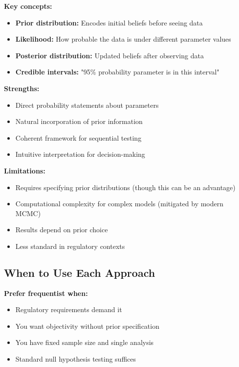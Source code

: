 \textbf{Key concepts:}
\begin{itemize}
    \item \textbf{Prior distribution:} Encodes initial beliefs before seeing data
    \item \textbf{Likelihood:} How probable the data is under different parameter values
    \item \textbf{Posterior distribution:} Updated beliefs after observing data
    \item \textbf{Credible intervals:} "95\% probability parameter is in this interval"
\end{itemize}

\textbf{Strengths:}
\begin{itemize}
    \item Direct probability statements about parameters
    \item Natural incorporation of prior information
    \item Coherent framework for sequential testing
    \item Intuitive interpretation for decision-making
\end{itemize}

\textbf{Limitations:}
\begin{itemize}
    \item Requires specifying prior distributions (though this can be an advantage)
    \item Computational complexity for complex models (mitigated by modern MCMC)
    \item Results depend on prior choice
    \item Less standard in regulatory contexts
\end{itemize}

\subsection{When to Use Each Approach}

\textbf{Prefer frequentist when:}
\begin{itemize}
    \item Regulatory requirements demand it
    \item You want objectivity without prior specification
    \item You have fixed sample size and single analysis
    \item Standard null hypothesis testing suffices
\end{itemize}

